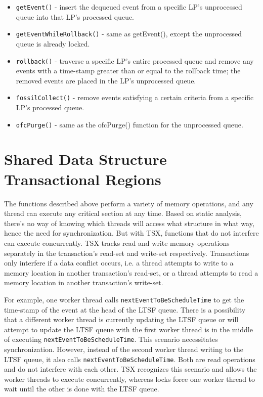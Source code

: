 \documentclass[11pt]{book}
\begin{document}
\begin{itemize}
  \item\texttt{getEvent()} - insert the dequeued event from a specific LP's unprocessed
    queue into that LP's processed queue.
  \item\texttt{getEventWhileRollback()} - same as getEvent(), except the unprocessed queue
    is already locked.%
  \item\texttt{rollback()} - traverse a specific LP's entire processed queue and remove
    any events with a time-stamp greater than or equal to the rollback time; the removed
    events are placed in the LP's unprocessed queue.
  \item\texttt{fossilCollect()} - remove events satisfying a certain criteria from a
    specific LP's processed queue.
  \item\texttt{ofcPurge()} - same as the ofcPurge() function for the unprocessed queue.
\end{itemize}

\section{Shared Data Structure Transactional Regions}

The functions described above perform a variety of memory operations, and any thread can
execute any critical section at any time.  Based on static analysis, there's no way of
knowing which threads will access what structure in what way, hence the need for
synchronization.  But with TSX, functions that do not interfere can execute concurrently.
TSX tracks read and write memory operations separately in the transaction's read-set and
write-set respectively.  Transactions only interfere if a data conflict occurs, i.e. a
thread attempts to write to a memory location in another transaction's read-set, or a
thread attempts to read a memory location in another transaction's write-set.

For example, one worker thread calls \texttt{nextEventToBeScheduleTime} to get the
time-stamp of the event at the head of the LTSF queue.  There is a possibility that a
different worker thread is currently updating the LTSF queue or will attempt to update the
LTSF queue with the first worker thread is in the middle of executing
\texttt{nextEventToBeScheduleTime}.  This scenario necessitates synchronization.  However,
instead of the second worker thread writing to the LTSF queue, it also calls
\texttt{nextEventToBeScheduleTime}.  Both are read operations and do not interfere with
each other.  TSX recognizes this scenario and allows the worker threads to execute
concurrently, whereas locks force one worker thread to wait until the other is done with
the LTSF queue.
\end{document}

